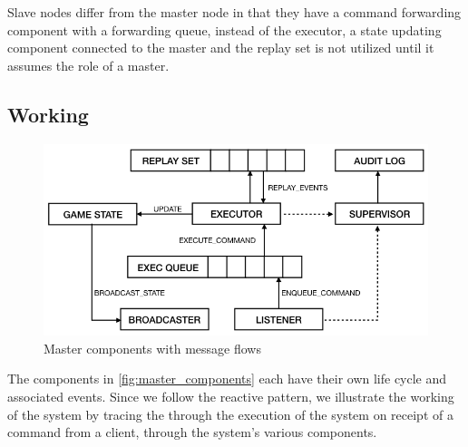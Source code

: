 \documentclass[a4paper]{IEEEtran}
\begin{document}
  Slave nodes differ from the master node in that they have a command forwarding component with a forwarding queue, instead of the executor, a state updating component connected to the master and the replay set is not utilized until it assumes the role of a master.
  
  \subsection{Working}
   
  \begin{figure}[bp]
    \centering
      \includegraphics[width=\columnwidth]{master_components.png}
    \caption{Master components with message flows}
    \label{fig:master_components}
  \end{figure}
  
  The components in \autoref{fig:master_components} each have their own life cycle and associated events. Since we follow the reactive pattern, we illustrate the working of the system by tracing the through the execution of the system on receipt of a command from a client, through the system's various components.
  
\end{document}
